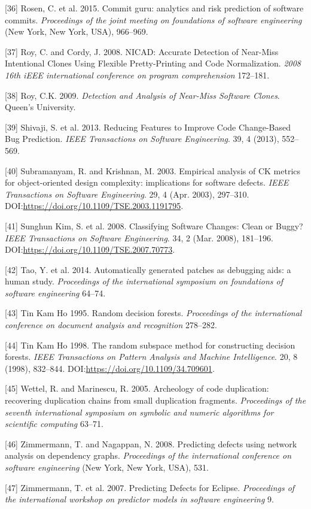 \documentclass[sigconf]{acmart}
\begin{document}
[36] Rosen, C. et al. 2015. Commit guru: analytics and risk
prediction of software commits. \emph{Proceedings of the joint meeting
on foundations of software engineering} (New York, New York, USA),
966--969.


[37] Roy, C. and Cordy, J. 2008. NICAD: Accurate Detection of
Near-Miss Intentional Clones Using Flexible Pretty-Printing and Code
Normalization. \emph{2008 16th iEEE international conference on program
comprehension} 172--181.


[38] Roy, C.K. 2009. \emph{Detection and Analysis of Near-Miss
Software Clones}. Queen's University.


[39] Shivaji, S. et al. 2013. Reducing Features to Improve Code
Change-Based Bug Prediction. \emph{IEEE Transactions on Software
Engineering}. 39, 4 (2013), 552--569.


[40] Subramanyam, R. and Krishnan, M. 2003. Empirical analysis of CK
metrics for object-oriented design complexity: implications for software
defects. \emph{IEEE Transactions on Software Engineering}. 29, 4 (Apr.
2003), 297--310. DOI:\url{https://doi.org/10.1109/TSE.2003.1191795}.


[41] Sunghun Kim, S. et al. 2008. Classifying Software Changes:
Clean or Buggy? \emph{IEEE Transactions on Software Engineering}. 34, 2
(Mar. 2008), 181--196. DOI:\url{https://doi.org/10.1109/TSE.2007.70773}.


[42] Tao, Y. et al. 2014. Automatically generated patches as
debugging aids: a human study. \emph{Proceedings of the international
symposium on foundations of software engineering} 64--74.


[43] Tin Kam Ho 1995. Random decision forests. \emph{Proceedings of
the international conference on document analysis and recognition}
278--282.


[44] Tin Kam Ho 1998. The random subspace method for constructing
decision forests. \emph{IEEE Transactions on Pattern Analysis and
Machine Intelligence}. 20, 8 (1998), 832--844.
DOI:\url{https://doi.org/10.1109/34.709601}.


[45] Wettel, R. and Marinescu, R. 2005. Archeology of code
duplication: recovering duplication chains from small duplication
fragments. \emph{Proceedings of the seventh international symposium on
symbolic and numeric algorithms for scientific computing} 63--71.


[46] Zimmermann, T. and Nagappan, N. 2008. Predicting defects using
network analysis on dependency graphs. \emph{Proceedings of the
international conference on software engineering} (New York, New York,
USA), 531.


[47] Zimmermann, T. et al. 2007. Predicting Defects for Eclipse.
\emph{Proceedings of the international workshop on predictor models in
software engineering} 9.




\end{document}
